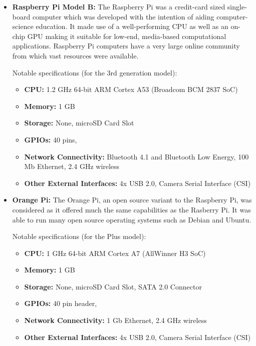      \begin{itemize}
        \item \textbf{Raspberry Pi Model B:}
          The Raspberry Pi was a credit-card sized single-board computer which was developed with the intention of aiding computer-science education. It made use of a well-performing CPU as well as an on-chip GPU making it suitable for low-end, media-based computational applications. Raspberry Pi computers have a very large online community from which vast resources were available.
          
          Notable specifications (for the 3rd generation model):
          \begin{itemize}
            \item \textbf{CPU:} 1.2 GHz 64-bit ARM Cortex A53 (Broadcom BCM 2837 SoC)
            \item \textbf{Memory:} 1 GB
            \item \textbf{Storage:} None, microSD Card Slot
            \item \textbf{GPIOs:} 40 pins, 
            \item \textbf{Network Connectivity:} Bluetooth 4.1 and Bluetooth Low Energy, 100 Mb Ethernet, 2.4 GHz wireless
            \item \textbf{Other External Interfaces:} 4x USB 2.0, Camera Serial Interface (CSI)
          \end{itemize}
        \item \textbf{Orange Pi:}
          The Orange Pi, an open source variant to the Raspberry Pi, was considered as it offered much the same capabilities as the Rasberry Pi. It was able to run many open source operating systems such as Debian and Ubuntu.
          
          Notable specifications (for the Plus model):
          \begin{itemize}
            \item \textbf{CPU:} 1 GHz 64-bit ARM Cortex A7 (AllWinner H3 SoC)
            \item \textbf{Memory:} 1 GB
            \item \textbf{Storage:} None, microSD Card Slot, SATA 2.0 Connector
            \item \textbf{GPIOs:} 40 pin header, 
            \item \textbf{Network Connectivity:} 1 Gb Ethernet, 2.4 GHz wireless
            \item \textbf{Other External Interfaces:} 4x USB 2.0, Camera Serial Interface (CSI)
          \end{itemize}
          

\end{itemize}
